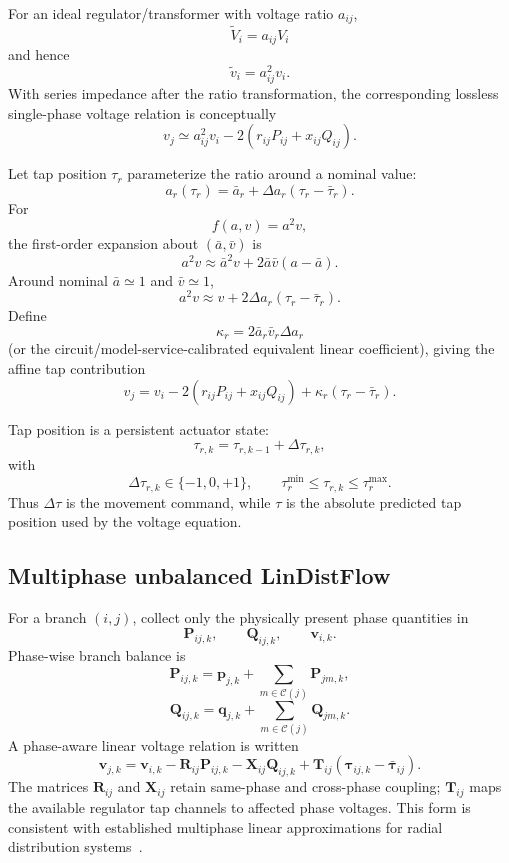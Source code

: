 For an ideal regulator/transformer with voltage ratio $a_{ij}$,
\[
\widetilde V_i
=
a_{ij}V_i
\]
and hence
\[
\widetilde v_i
=
a_{ij}^{2}v_i.
\]
With series impedance after the ratio transformation, the corresponding lossless
single-phase voltage relation is conceptually
\[
v_j
\simeq
a_{ij}^{2}v_i
-
2(r_{ij}P_{ij}+x_{ij}Q_{ij}).
\]

Let tap position $\tau_r$ parameterize the ratio around a nominal value:
\[
a_r(\tau_r)
=
\bar a_r
+
\Delta a_r
(\tau_r-\bar\tau_r).
\]
For
\[
f(a,v)=a^2v,
\]
the first-order expansion about $(\bar a,\bar v)$ is
\[
a^2v
\approx
\bar a^2v
+
2\bar a\bar v(a-\bar a).
\]
Around nominal $\bar a\simeq1$ and $\bar v\simeq1$,
\[
a^2v
\approx
v
+
2\Delta a_r
(\tau_r-\bar\tau_r).
\]
Define
\[
\kappa_r
=
2\bar a_r\bar v_r\Delta a_r
\]
(or the circuit/model-service-calibrated equivalent linear coefficient), giving the
affine tap contribution
\[
\boxed{
v_j
=
v_i
-
2(r_{ij}P_{ij}+x_{ij}Q_{ij})
+
\kappa_r(\tau_r-\bar\tau_r).
}
\]

Tap position is a persistent actuator state:
\[
\boxed{
\tau_{r,k}
=
\tau_{r,k-1}
+
\Delta\tau_{r,k},
}
\]
with
\[
\Delta\tau_{r,k}\in\{-1,0,+1\},
\qquad
\tau_r^{\min}
\le
\tau_{r,k}
\le
\tau_r^{\max}.
\]
Thus $\Delta\tau$ is the movement command, while $\tau$ is the absolute predicted tap
position used by the voltage equation.

\subsection{Multiphase unbalanced LinDistFlow}
\label{subsec:p1_multiphase}

For a branch $(i,j)$, collect only the physically present phase quantities in
\[
\mathbf P_{ij,k},
\qquad
\mathbf Q_{ij,k},
\qquad
\mathbf v_{i,k}.
\]
Phase-wise branch balance is
\[
\mathbf P_{ij,k}
=
\mathbf p_{j,k}
+
\sum_{m\in\mathcal C(j)}
\mathbf P_{jm,k},
\]
\[
\mathbf Q_{ij,k}
=
\mathbf q_{j,k}
+
\sum_{m\in\mathcal C(j)}
\mathbf Q_{jm,k}.
\]
A phase-aware linear voltage relation is written
\[
\boxed{
\mathbf v_{j,k}
=
\mathbf v_{i,k}
-
\mathbf R_{ij}\mathbf P_{ij,k}
-
\mathbf X_{ij}\mathbf Q_{ij,k}
+
\mathbf T_{ij}
(\boldsymbol\tau_{ij,k}-\bar{\boldsymbol\tau}_{ij}).
}
\]
The matrices $\mathbf R_{ij}$ and $\mathbf X_{ij}$ retain same-phase and cross-phase
coupling; $\mathbf T_{ij}$ maps the available regulator tap channels to affected phase
voltages.  This form is consistent with established multiphase linear approximations for
radial distribution systems~\cite{gan2014multiphase}.

